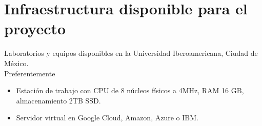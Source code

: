 \section {Infraestructura disponible para el proyecto}
Laboratorios y equipos disponibles en la Universidad Iberoamericana, Ciudad de México.\\

Preferentemente\begin{itemize}
\item Estación de trabajo con CPU de 8 núcleos físicos a 4MHz, RAM 16 GB, almacenamiento 2TB SSD.
\item Servidor virtual en Google Cloud, Amazon, Azure o IBM.
\end{itemize}
